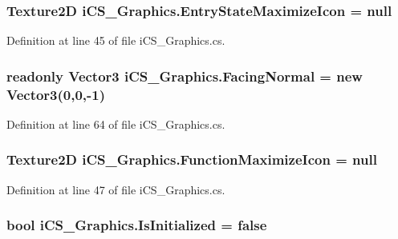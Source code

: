 \hypertarget{classi_c_s___graphics_a12b6a81bdfe049f423183110722c4f73}{
\subsubsection[{Entry\+State\+Maximize\+Icon}]{\setlength{\rightskip}{0pt plus 5cm}Texture2\+D i\+C\+S\+\_\+\+Graphics.\+Entry\+State\+Maximize\+Icon = null}}\label{classi_c_s___graphics_a12b6a81bdfe049f423183110722c4f73}


Definition at line 45 of file i\+C\+S\+\_\+\+Graphics.\+cs.

\hypertarget{classi_c_s___graphics_a4fa22a071070bf3e90fe8e3f7a6568e1}{
\subsubsection[{Facing\+Normal}]{\setlength{\rightskip}{0pt plus 5cm}readonly Vector3 i\+C\+S\+\_\+\+Graphics.\+Facing\+Normal = new Vector3(0,0,-\/1)\hspace{0.3cm}{\ttfamily [static]}}}\label{classi_c_s___graphics_a4fa22a071070bf3e90fe8e3f7a6568e1}


Definition at line 64 of file i\+C\+S\+\_\+\+Graphics.\+cs.

\hypertarget{classi_c_s___graphics_a55744c7b423a2ad4cf8940edd9d8f9fa}{
\subsubsection[{Function\+Maximize\+Icon}]{\setlength{\rightskip}{0pt plus 5cm}Texture2\+D i\+C\+S\+\_\+\+Graphics.\+Function\+Maximize\+Icon = null}}\label{classi_c_s___graphics_a55744c7b423a2ad4cf8940edd9d8f9fa}


Definition at line 47 of file i\+C\+S\+\_\+\+Graphics.\+cs.

\hypertarget{classi_c_s___graphics_a1f8a171d51aa2ac01f5275845d2637ba}{
\subsubsection[{Is\+Initialized}]{\setlength{\rightskip}{0pt plus 5cm}bool i\+C\+S\+\_\+\+Graphics.\+Is\+Initialized = false\hspace{0.3cm}{\ttfamily [static]}}}\label{classi_c_s___graphics_a1f8a171d51aa2ac01f5275845d2637ba}


